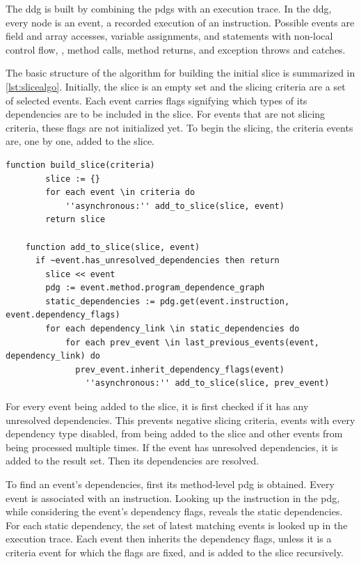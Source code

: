 The \acf{ddg} is built by combining the \acfp{pdg} with an execution trace.
In the \ac{ddg}, every node is an event, a recorded execution of an instruction.
Possible events are field and array accesses, variable assignments, and statements with non-local control flow, \ie, method calls, method returns, and exception throws and catches.

The basic structure of the algorithm for building the initial slice is summarized in \cref{lst:slicealgo}.
Initially, the slice is an empty set and the slicing criteria are a set of selected events.
Each event carries flags signifying which types of its dependencies are to be included in the slice.
For events that are not slicing criteria, these flags are not initialized yet.
To begin the slicing, the criteria events are, one by one, added to the slice.

\begin{lstlisting}[float=t,language=algorithm,label=lst:slicealgo,caption={Simplified algorithm for building the slice}]
	function build_slice(criteria)
		slice := {}
		for each event \in criteria do
			''asynchronous:'' add_to_slice(slice, event)
		return slice
		
	function add_to_slice(slice, event)
	  if ~event.has_unresolved_dependencies then return
		slice << event
		pdg := event.method.program_dependence_graph
		static_dependencies := pdg.get(event.instruction, event.dependency_flags)
		for each dependency_link \in static_dependencies do
			for each prev_event \in last_previous_events(event, dependency_link) do
			  prev_event.inherit_dependency_flags(event)
				''asynchronous:'' add_to_slice(slice, prev_event)
\end{lstlisting}

For every event being added to the slice, it is first checked if it has any unresolved dependencies.
This prevents negative slicing criteria, events with every dependency type disabled, from being added to the slice and other events from being processed multiple times.
If the event has unresolved dependencies, it is added to the result set. 
Then its dependencies are resolved.

To find an event's dependencies, first its method-level \ac{pdg} is obtained.
Every event is associated with an instruction.
Looking up the instruction in the \ac{pdg}, while considering the event's dependency flags, reveals the static dependencies.
For each static dependency, the set of latest matching events is looked up in the execution trace.
Each event then inherits the dependency flags, unless it is a criteria event for which the flags are fixed, and is added to the slice recursively.

